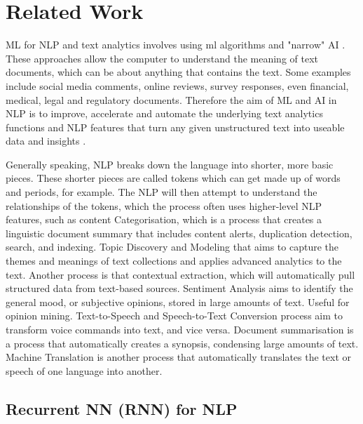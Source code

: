 \documentclass[a4paper,10pt]{article}
\begin{document}
\section{Related Work}
\label{sec:related_work}

	ML for NLP and text analytics involves using ml algorithms and "narrow" AI \cite{ml_nlp}. These approaches allow the computer to understand the meaning of text documents, which can be about anything that contains the text. Some examples include social media comments, online reviews, survey responses, even financial, medical, legal and regulatory documents. Therefore the aim of ML and AI in NLP is to improve, accelerate and automate the underlying text analytics functions and NLP features that turn any given unstructured text into useable data and insights \cite{ml_nlp}.
	
	Generally speaking, NLP breaks down the language into shorter, more basic pieces. These shorter pieces are called tokens which can get made up of words and periods, for example. The NLP will then attempt to understand the relationships of the tokens, which the process often uses higher-level NLP features, such as \cite{nlp_history} content Categorisation, which is a process that creates a linguistic document summary that includes content alerts, duplication detection, search, and indexing. Topic Discovery and Modeling that aims to capture the themes and meanings of text collections and applies advanced analytics to the text. Another process is that contextual extraction, which will automatically pull structured data from text-based sources. Sentiment Analysis aims to identify the general mood, or subjective opinions, stored in large amounts of text. Useful for opinion mining. Text-to-Speech and Speech-to-Text Conversion process aim to transform voice commands into text, and vice versa. Document summarisation is a process that automatically creates a synopsis, condensing large amounts of text. Machine Translation is another process that automatically translates the text or speech of one language into another.



\subsection{Recurrent NN (RNN) for NLP}
\end{document}
